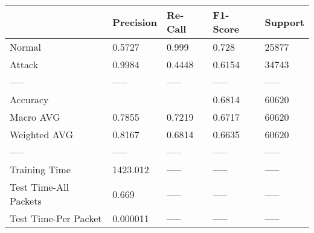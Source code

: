 \begin{tabular}{lllll}
\toprule
{} & Precision & Re-Call & F1-Score & Support \\
\midrule
Normal                &    0.5727 &   0.999 &    0.728 &   25877 \\
Attack                &    0.9984 &  0.4448 &   0.6154 &   34743 \\
-----                 &     ----- &   ----- &    ----- &   ----- \\
Accuracy              &           &         &   0.6814 &   60620 \\
Macro AVG             &    0.7855 &  0.7219 &   0.6717 &   60620 \\
Weighted AVG          &    0.8167 &  0.6814 &   0.6635 &   60620 \\
-----                 &     ----- &   ----- &    ----- &   ----- \\
Training Time         &  1423.012 &   ----- &    ----- &   ----- \\
Test Time-All Packets &     0.669 &   ----- &    ----- &   ----- \\
Test Time-Per Packet  &  0.000011 &   ----- &    ----- &   ----- \\
\bottomrule
\end{tabular}
